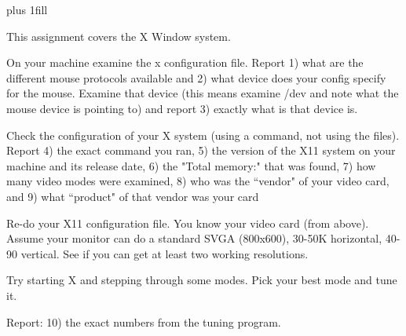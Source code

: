 
\rightskip=0pt plus 1fill

\parindent 0pt

This assignment covers the X Window system.

On your machine examine the x configuration file.
Report 1) what are the different mouse protocols available and 
2) what device does your config specify for the mouse.
Examine that device (this means examine {\ltt{}/dev} and
note what the mouse device is pointing to)
and report 3) exactly what is that device is.

Check the configuration of your X system (using a command, not using
the files).
Report
4) the exact command you ran,
5) the version of the X11 system on your machine and its release date,
6) the "Total memory:" that was found,
7) how many video modes were examined,
8) who was the ``vendor" of your video card,
and 
9) what ``product" of that vendor was your card

Re-do your X11 configuration file.
You know your video card (from above).
Assume your monitor can do a standard SVGA (800x600), 30-50K horizontal,
40-90 vertical.
See if you can get at least two working resolutions.

Try starting X and stepping through some modes. Pick your
best mode and tune it.

Report: 10) the exact numbers from the tuning program.

\bye
